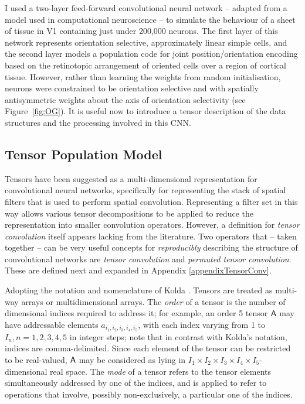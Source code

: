 I used a two-layer feed-forward convolutional neural network -- adapted from a model used in computational neuroscience -- to simulate the behaviour of a sheet of tissue in V1 containing just under 200,000 neurons. The first layer of this network represents orientation selective, approximately linear simple cells, and the second layer models a population code for joint position/orientation encoding based on the retinotopic arrangement of oriented cells over a region of cortical tissue.  However, rather than learning the weights from random initialisation, neurons were constrained to be orientation selective and with spatially antisymmetric weights about the axis of orientation selectivity (see Figure~\ref{fig:OG}). It is useful now to introduce a tensor description of the data structures and the processing involved in this CNN.

\subsection{Tensor Population Model}
Tensors have been suggested as a multi-dimensional representation for convolutional neural networks, specifically for representing the stack of spatial filters that is used to perform spatial convolution. Representing a filter set in this way allows various tensor decompositions to be applied \cite{kolda2009tensor} to reduce the representation into smaller convolution operators. However, a definition for \textit{tensor convolution} itself appears lacking from the literature. Two operators that -- taken together -- can be very useful concepts for \textit{reproducibly} describing the structure of convolutional networks are \textit{tensor convolution} and \textit{permuted tensor convolution}. These are defined next and expanded in Appendix \ref{appendixTensorConv}.

Adopting the notation and nomenclature of Kolda \cite{kolda2009tensor}.  Tensors are treated as multi-way arrays or multidimensional arrays. The  \textit{order} of a tensor is the number of dimensional indices required to address it; for example, an order 5 tensor $\mathsf{A}$ may have addressable elements $a_{i_1,i_2,i_3,i_4,i_5}$, with each index varying from 1 to $I_n, n = 1,2,3,4,5$ in integer steps; note that in contrast with Kolda's notation, indices are comma-delimited.  Since each element of the tensor can be restricted to be real-valued, $\mathsf{A}$ may be considered as lying in $I_1\times I_2\times I_3 \times I_4 \times I_5$- dimensional real space. The \textit{mode} of a tensor refers to the tensor elements simultaneously addressed by one of the indices, and is applied to refer to operations that involve, possibly non-exclusively, a particular one of the indices. 

